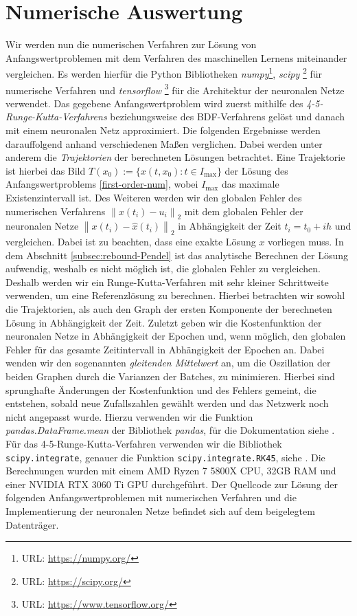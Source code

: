 \section{Numerische Auswertung}
\label{sec:verfahrensvergleich}
Wir werden nun die numerischen Verfahren zur Lösung von Anfangswertproblemen mit dem Verfahren des maschinellen Lernens
miteinander vergleichen. Es werden hierfür die Python Bibliotheken \textit{numpy}\footnote{URL: \url{https://numpy.org/}},
\textit{scipy} \footnote{URL: \url{https://scipy.org/}} für numerische Verfahren und \textit{tensorflow}
\footnote{URL: \url{https://www.tensorflow.org/}} für die Architektur der neuronalen Netze verwendet. Das gegebene
Anfangswertproblem wird zuerst mithilfe des \textit{4-5-Runge-Kutta-Verfahrens} beziehungsweise des BDF-Verfahrens
gelöst und danach mit einem neuronalen Netz approximiert. Die folgenden Ergebnisse werden darauffolgend anhand
verschiedenen Maßen verglichen. Dabei werden unter anderem die \textit{Trajektorien} der berechneten Lösungen betrachtet.
Eine Trajektorie ist hierbei das Bild $T(x_0):= \{x(t,x_0): t\in I_{\text{max}}\}$ der Lösung des Anfangswertproblems
\eqref{first-order-num}, wobei $I_{\text{max}}$ das maximale Existenzintervall ist. Des Weiteren werden wir den globalen
Fehler des numerischen Verfahrens $\left\lVert x(t_i) - u_i \right\rVert_2$ mit dem globalen Fehler der neuronalen Netze
$\left\lVert x(t_i) - \hat{x}(t_i) \right\rVert_2$ in Abhängigkeit der Zeit $t_i=t_0 + ih$ und vergleichen. Dabei
ist zu beachten, dass eine exakte Lösung $x$ vorliegen muss. In dem Abschnitt \ref{subsec:rebound-Pendel} ist das
analytische Berechnen der Lösung aufwendig, weshalb es nicht möglich ist, die globalen Fehler zu vergleichen. Deshalb
werden wir ein Runge-Kutta-Verfahren mit sehr kleiner Schrittweite verwenden, um eine Referenzlösung zu berechnen.
Hierbei betrachten wir sowohl die Trajektorien, als auch den Graph der ersten Komponente
der berechneten Lösung in Abhängigkeit der Zeit.
Zuletzt geben wir die Kostenfunktion der neuronalen Netze in Abhängigkeit der Epochen und, wenn möglich, den globalen
Fehler für das gesamte Zeitintervall in Abhängigkeit der Epochen an. Dabei wenden wir den sogenannten
\textit{gleitenden Mittelwert} an, um die Oszillation der beiden Graphen durch die Varianzen der Batches, zu
minimieren. Hierbei sind sprunghafte Änderungen der Kostenfunktion und des Fehlers gemeint, die entstehen, sobald neue
Zufallszahlen gewählt werden und das Netzwerk noch nicht angepasst wurde. Hierzu verwenden wir die Funktion
\textit{pandas.DataFrame.mean} der Bibliothek \textit{pandas}, für die Dokumentation siehe \cite{PandasDataFrameMean}.
Für das 4-5-Runge-Kutta-Verfahren verwenden wir die Bibliothek \texttt{scipy.integrate}, genauer die Funktion
\texttt{scipy.integrate.RK45},  siehe \cite{ScipyIntegrateRK45}. Die Berechnungen wurden mit einem AMD Ryzen 7 5800X CPU,
32GB RAM und einer NVIDIA RTX 3060 Ti GPU durchgeführt. Der Quellcode zur Lösung der folgenden Anfangswertproblemen mit
numerischen Verfahren und die Implementierung der neuronalen Netze befindet sich auf dem beigelegtem Datenträger.
\newpage

